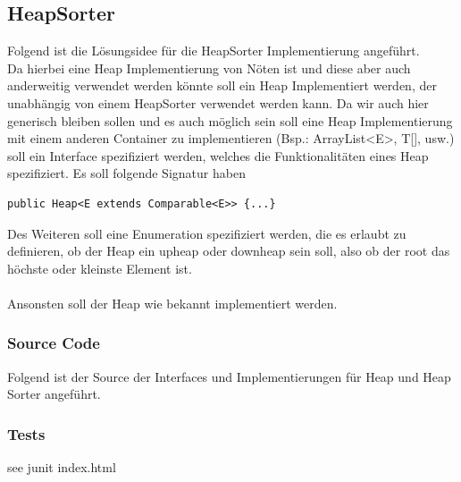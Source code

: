 \documentclass[11pt, a4paper, twoside]{article}   	%
\newcommand{\srcDir}{../src/main/java}
\newcommand{\mainPackage}{\srcDir/at/fhooe/swe4/lab3}
\newcommand{\testSection}{Tests}
\begin{document}
\newpage
\subsection{HeapSorter}
Folgend ist die Lösungsidee für die HeapSorter Implementierung angeführt.\\
Da hierbei eine Heap Implementierung von Nöten ist und diese aber auch anderweitig verwendet werden könnte soll ein Heap Implementiert werden, der unabhängig von einem HeapSorter verwendet werden kann. Da wir auch hier generisch bleiben sollen und es auch möglich sein soll eine Heap Implementierung mit einem anderen Container zu implementieren (Bsp.: ArrayList\textless E\textgreater, T[], usw.) soll ein Interface spezifiziert werden, welches die Funktionalitäten eines Heap spezifiziert. Es soll folgende Signatur haben
\begin{lstlisting}
public Heap<E extends Comparable<E>> {...}
\end{lstlisting}
Des Weiteren soll eine Enumeration spezifiziert werden, die es erlaubt zu definieren, ob der Heap ein upheap oder downheap sein soll, also ob der root das höchste oder kleinste Element ist.\\\\
Ansonsten soll der Heap wie bekannt implementiert werden.
\subsubsection{Source Code}
Folgend ist der Source der Interfaces und Implementierungen für Heap und Heap Sorter angeführt.



\subsubsection{\testSection}
see junit index.html
\end{document}
